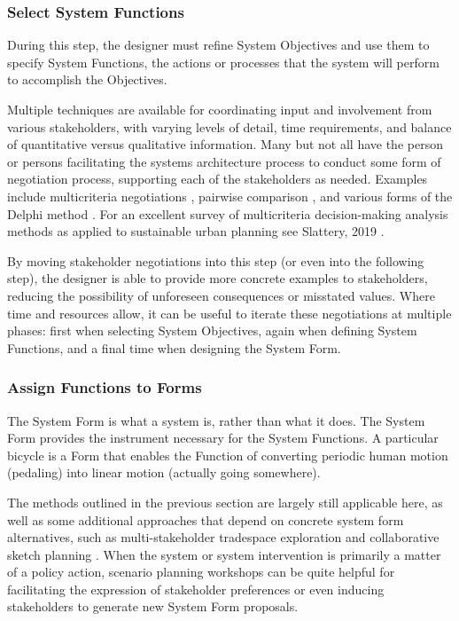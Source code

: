 \subsubsection{Select System Functions}

During this step, the designer must refine System Objectives and use them to specify System Functions, the actions or processes that the system will perform to accomplish the Objectives.

Multiple techniques are available for coordinating input and involvement from various stakeholders, with varying levels of detail, time requirements, and balance of quantitative versus qualitative information. Many but not all have the person or persons facilitating the systems architecture process to conduct some form of negotiation process, supporting each of the stakeholders as needed. Examples include  multicriteria negotiations \cite{sparrevikUseMulticriteriaInvolvement2011},  pairwise comparison \cite{motieyanSustainableUrbanPlanning2017}, and various forms of the Delphi method \cite{morganUrbanPlanningUsing1979}. For an excellent survey of multicriteria decision-making analysis methods as applied to sustainable urban planning see Slattery, 2019 \cite{slatteryQuantitativeAssessmentSustainable2019}.

By moving stakeholder negotiations into this step (or even into the following step), the designer is able to provide more concrete examples to stakeholders, reducing the possibility of unforeseen consequences or misstated values. Where time and resources allow, it can be useful to iterate these negotiations at multiple phases: first when selecting System Objectives, again when defining System Functions, and a final time when designing the System Form.


\subsubsection{Assign Functions to Forms} \label{sec:saf-assign}

The System Form is what a system is, rather than what it does. The System Form provides the instrument necessary for the System Functions. A particular bicycle is a Form that enables the Function of converting periodic human motion (pedaling) into linear motion (actually going somewhere).

The methods outlined in the previous section are largely still applicable here, as well as some additional approaches that depend on concrete system form alternatives, such as multi-stakeholder tradespace exploration \cite{fitzgeraldRecommendationsFramingMultistakeholder2016} and collaborative sketch planning \cite{vonkSociotechnicalPSSDevelopment2010}. When the system or system intervention is primarily a matter of a policy action, scenario planning workshops can be quite helpful for facilitating the expression of stakeholder preferences or even inducing stakeholders to generate new System Form proposals.

